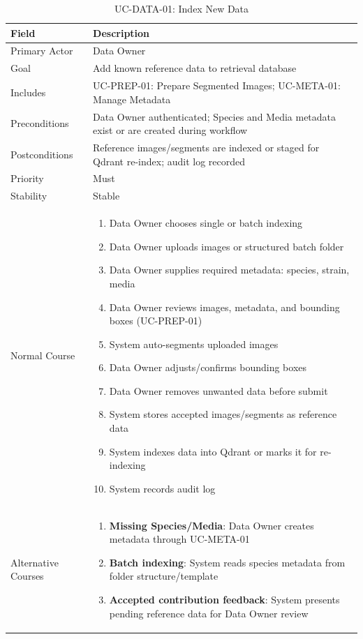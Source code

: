 \begin{table}[H]
\centering
\caption{UC-DATA-01: Index New Data}
\label{tab:uc_data}
\small
\begin{tabularx}{\textwidth}{@{}p{3cm} X@{}}
\toprule
\textbf{Field} & \textbf{Description} \\
\midrule
Primary Actor & Data Owner \\
Goal & Add known reference data to retrieval database \\
Includes & UC-PREP-01: Prepare Segmented Images; UC-META-01: Manage Metadata \\
Preconditions & Data Owner authenticated; Species and Media metadata exist or are created during workflow \\
Postconditions & Reference images/segments are indexed or staged for Qdrant re-index; audit log recorded \\
Priority & Must \\
Stability & Stable \\
Normal Course &
\begin{enumerate}[nosep]
  \item Data Owner chooses single or batch indexing
  \item Data Owner uploads images or structured batch folder
  \item Data Owner supplies required metadata: species, strain, media
  \item Data Owner reviews images, metadata, and bounding boxes (UC-PREP-01)
  \item System auto-segments uploaded images
  \item Data Owner adjusts/confirms bounding boxes
  \item Data Owner removes unwanted data before submit
  \item System stores accepted images/segments as reference data
  \item System indexes data into Qdrant or marks it for re-indexing
  \item System records audit log
\end{enumerate} \\
Alternative Courses &
\begin{enumerate}[nosep]
  \item \textbf{Missing Species/Media}: Data Owner creates metadata through UC-META-01
  \item \textbf{Batch indexing}: System reads species metadata from folder structure/template
  \item \textbf{Accepted contribution feedback}: System presents pending reference data for Data Owner review

\end{enumerate}
\end{tabularx}
\end{table}
